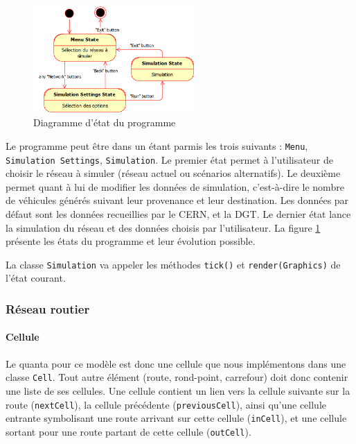 \documentclass[a4paper,11pt, titlepage]{extarticle}
\begin{document}
\begin{figure}
  \vspace{-1cm}

  \begin{center}
    \includegraphics[width=0.55\textwidth]{states_diagram.png}
  \end{center}
  \caption{Diagramme d'état du programme}
  \label{imgStates}
\end{figure}

Le programme peut être dans un étant parmis les trois suivants : \texttt{Menu}, \texttt{Simulation Settings}, \texttt{Simulation}. Le premier état permet à l'utilisateur de choisir le réseau à simuler (réseau actuel ou scénarios alternatifs). Le deuxième permet quant à lui de modifier les données de simulation, c'est-à-dire le nombre de véhicules générés suivant leur provenance et leur destination. Les données par défaut sont les données recueillies par le CERN, et la DGT. Le dernier état lance la simulation du réseau et des données choisis par l'utilisateur. La figure \ref{imgStates} présente les états du programme et leur évolution possible.

La classe \texttt{Simulation} va appeler les méthodes \texttt{tick()} et \texttt{render(Graphics)} de l'état courant.

\subsubsection{Réseau routier}

\paragraph{Cellule}

Le quanta pour ce modèle est donc une cellule que nous implémentons dans une classe \texttt{Cell}. Tout autre élément (route, rond-point, carrefour) doit donc contenir une liste de ses cellules. Une cellule contient un lien vers la cellule suivante sur la route (\texttt{nextCell}), la cellule précédente (\texttt{previousCell}), ainsi qu'une cellule entrante symbolisant une route arrivant sur cette cellule (\texttt{inCell}), et une cellule sortant pour une route partant de cette cellule (\texttt{outCell}).
\end{document}
